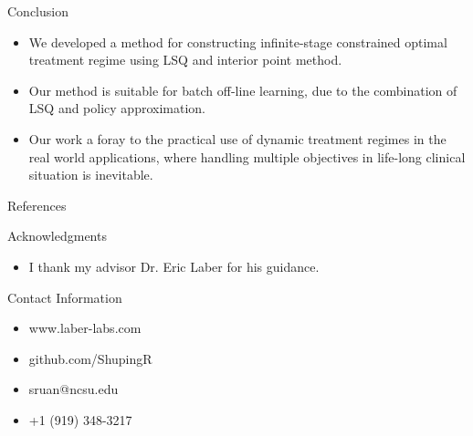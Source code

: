 \documentclass[final,hyperref={pdfpagelabels=false}]{beamer}
\begin{document}
\begin{frame}[t]
\begin{columns}[t]
\begin{column}{.465\textwidth}
\begin{block}{Conclusion}
\begin{itemize}
\item We developed a method for constructing infinite-stage constrained optimal treatment regime using LSQ and interior point method.
\item Our method is suitable for batch off-line learning, due to the combination of LSQ and policy  approximation.
\item Our work a foray to the practical use of dynamic treatment regimes in the real world applications, where handling multiple objectives in life-long clinical situation is inevitable.
\end{itemize}
\end{block}


\begin{block}{References}
\nocite{*} %
\small{
	
	
}
\end{block}


\begin{block}{Acknowledgments}

\begin{itemize}
\item I thank my advisor Dr. Eric Laber for his guidance.
\end{itemize}

\end{block}



\begin{block}{Contact Information}

\begin{itemize}
\item www.laber-labs.com
\item github.com/ShupingR
\item sruan@ncsu.edu
\item +1 (919) 348-3217
\end{itemize}


\end{block}
\end{column}
\end{columns}
\end{frame}
\end{document}
